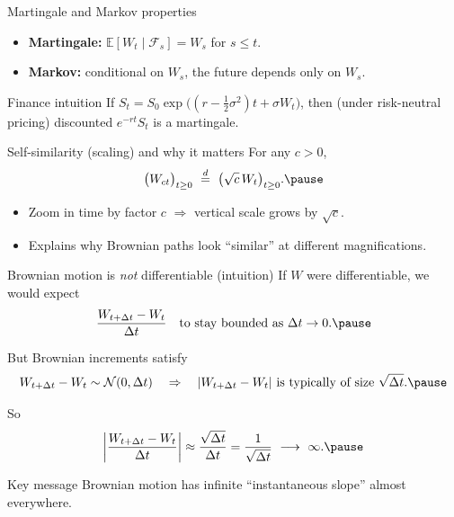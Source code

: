 \documentclass[10pt,aspectratio=169]{beamer}
\begin{document}
\begin{frame}{Martingale and Markov properties}
\begin{itemize}
  \item \textbf{Martingale:} $\mathbb{E}[W_t\mid\mathcal{F}_s]=W_s$ for $s\le t$.\pause
  \item \textbf{Markov:} conditional on $W_s$, the future depends only on $W_s$.\pause
\end{itemize}

\medskip
\begin{exampleblock}{Finance intuition}
If $S_t=S_0\exp\big((r-\tfrac12\sigma^2)t+\sigma W_t\big)$, then (under risk-neutral pricing)
discounted $e^{-rt}S_t$ is a martingale.\pause
\end{exampleblock}
\end{frame}

\begin{frame}{Self-similarity (scaling) and why it matters}
For any $c>0$,
\[
\big(W_{ct}\big)_{t\ge0}
\ \overset{d}{=}\
\big(\sqrt{c}\,W_t\big)_{t\ge0}.\pause
\]

\begin{itemize}
  \item Zoom in time by factor $c$ $\Rightarrow$ vertical scale grows by $\sqrt{c}$.\pause
  \item Explains why Brownian paths look ``similar'' at different magnifications.
\end{itemize}
\end{frame}

\begin{frame}{Brownian motion is \emph{not} differentiable (intuition)}
If $W$ were differentiable, we would expect
\[
\frac{W_{t+\Delta t}-W_t}{\Delta t}
\quad \text{to stay bounded as }\Delta t\to0.\pause
\]

But Brownian increments satisfy
\[
W_{t+\Delta t}-W_t \sim \mathcal{N}(0,\Delta t)
\quad\Rightarrow\quad
|W_{t+\Delta t}-W_t|\ \text{is typically of size }\sqrt{\Delta t}.\pause
\]

So
\[
\left|\frac{W_{t+\Delta t}-W_t}{\Delta t}\right|
\approx
\frac{\sqrt{\Delta t}}{\Delta t}
=
\frac{1}{\sqrt{\Delta t}}
\ \longrightarrow\ \infty.\pause
\]

\begin{exampleblock}{Key message}
Brownian motion has infinite ``instantaneous slope'' almost everywhere.\pause
\end{exampleblock}
\end{frame}
\end{document}
